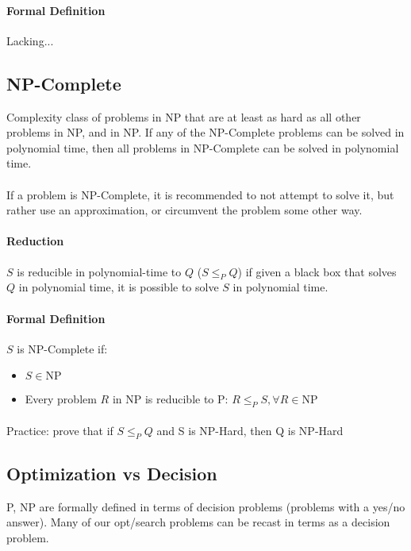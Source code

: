 \documentclass[a4paper]{article}
\begin{document}
\paragraph{Formal Definition} Lacking...

\subsection{NP-Complete}
Complexity class of problems in NP that are at least as hard as all other problems in NP, and in NP. If any of the NP-Complete problems can be solved in polynomial time, then all problems in NP-Complete can be solved in polynomial time.

\paragraph{}
If a problem is NP-Complete, it is recommended to not attempt to solve it, but rather use an approximation, or circumvent the problem some other way.

\paragraph{Reduction}
$S$ is reducible in polynomial-time to $Q$ ($S \le_P Q$) if given a black box that solves $Q$ in polynomial time, it is possible to solve $S$ in polynomial time.

\paragraph{Formal Definition}
$S$ is NP-Complete if:

\begin{itemize}
  \item $S \in \text{NP}$
  \item Every problem $R$ in NP is reducible to P: $R \le_P S, \forall R \in \text{NP}$
\end{itemize}

\paragraph{}
Practice: prove that if $S \le_P Q$ and S is NP-Hard, then Q is NP-Hard

\subsection{Optimization vs Decision}
P, NP are formally defined in terms of decision problems (problems with a yes/no answer). Many of our opt/search problems can be recast in terms as a decision problem.
\end{document}
